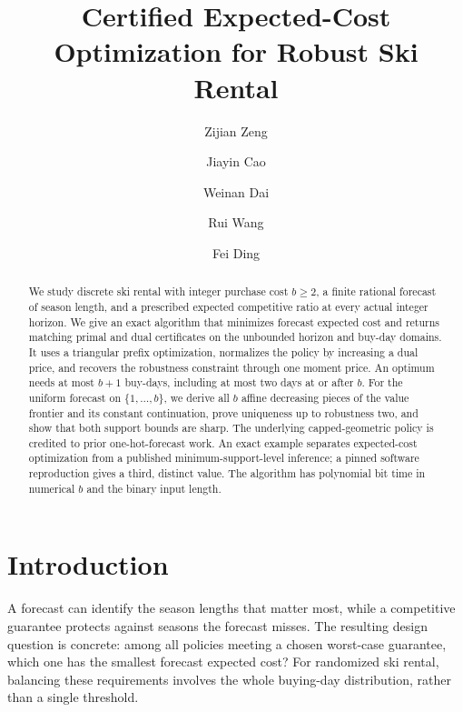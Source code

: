 \documentclass[manuscript,11pt,screen,nonacm]{acmart}
\title{Certified Expected-Cost Optimization for Robust Ski Rental}
\author{Zijian Zeng}
\affiliation{\institution{UCSI University}\city{}\country{Malaysia}}
\author{Jiayin Cao}
\affiliation{\institution{Ningbo University}\city{}\country{China}}
\author{Weinan Dai}
\affiliation{\institution{Zhejiang University}\city{}\country{China}}
\author{Rui Wang}
\affiliation{\institution{Nanchang Institute of Technology}\city{}\country{China}}
\author{Fei Ding}
\affiliation{\institution{Alibaba Group}\city{}\country{China}}
\date{}
\begin{document}
\singlespacing
\begin{abstract}
\normalsize
We study discrete ski rental with integer purchase cost $b\ge2$, a finite
rational forecast of season length, and a prescribed expected competitive
ratio at every actual integer horizon. We give an exact algorithm that
minimizes forecast expected cost and returns matching primal and dual
certificates on the unbounded horizon and buy-day domains. It uses a
triangular prefix optimization, normalizes the policy by increasing a dual
price, and recovers the robustness constraint through one moment price.
An optimum needs at most $b+1$ buy-days, including at most two days at or
after $b$. For the uniform forecast on $\{1,\ldots,b\}$, we derive all $b$
affine decreasing pieces of the value frontier and its constant continuation,
prove uniqueness up to robustness two, and show that both support bounds
are sharp. The underlying capped-geometric policy is credited to prior
one-hot-forecast work. An exact example separates expected-cost optimization
from a published minimum-support-level inference; a pinned software
reproduction gives a third, distinct value. The algorithm has polynomial
bit time in numerical $b$ and the binary input length.
\end{abstract}
\hypersetup{pageanchor=false}
\maketitle
{}
\enlargethispage{-12pt}\thispagestyle{empty}\clearpage
\setcounter{page}{1}\hypersetup{pageanchor=true}\pagestyle{submission}

\section{Introduction}\label{sec:intro}
A forecast can identify the season lengths that matter most, while a
competitive guarantee protects against seasons the forecast misses. The
resulting design question is concrete: among all policies meeting a chosen
worst-case guarantee, which one has the smallest forecast expected cost?
For randomized ski rental, balancing these requirements involves the whole
buying-day distribution, rather than a single threshold.
\end{document}

